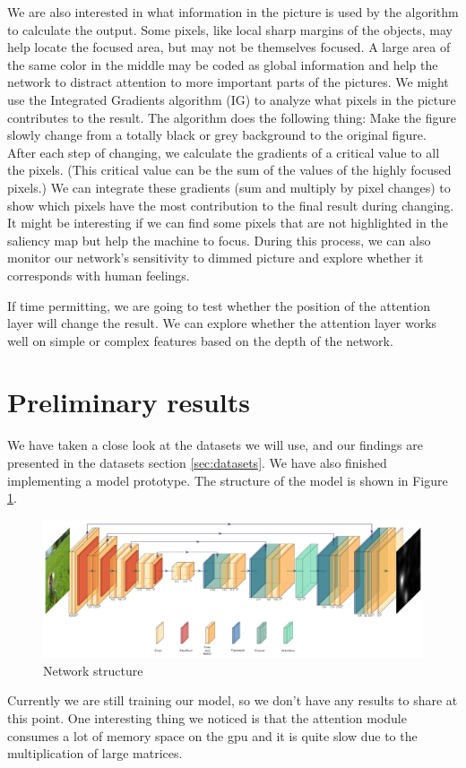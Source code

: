 \documentclass[12pt]{article}
\begin{document}
We are also interested in what information in the picture is used by the algorithm to calculate the output. Some pixels, like local sharp margins of the objects, may help locate the focused area, but may not be themselves focused. A large area of the same color in the middle may be coded as global information and help the network to distract attention to more important parts of the pictures.
We might use the Integrated Gradients algorithm (IG) \cite{sundararajan2017axiomatic} to analyze what pixels in the picture contributes to the result. The algorithm does the following thing: Make the figure slowly change from a totally black or grey background to the original figure.
After each step of changing, we calculate the gradients of a critical value to all the pixels. (This critical value can be the sum of the values of the highly focused pixels.) We can integrate these gradients (sum and multiply by pixel changes) to show which pixels have the most contribution to the final result during changing.
It might be interesting if we can find some pixels that are not highlighted in the saliency map but help the machine to focus. 
During this process, we can also monitor our network's sensitivity to dimmed picture and explore whether it corresponds with human feelings. 

If time permitting, we are going to test whether the position of the attention layer will change the result. We can explore whether the attention layer works well on simple or complex features based on the depth of the network.

\section{Preliminary results}
We have taken a close look at the datasets we will use, and our findings are presented
in the datasets section \ref{sec:datasets}. We have also finished implementing a model prototype.
The structure of the model is shown in Figure \ref{img:network}.
\begin{figure}[!h]
    \centering
    \includegraphics[width=7in]{imgs/network.pdf}
    \caption{Network structure}
    \label{img:network}
\end{figure}
Currently we are still training our model, so we don't have any results to share at this point.
One interesting thing we noticed is that the attention module consumes a lot of memory space 
on the gpu and it is quite slow due to the multiplication of large matrices.
\end{document}
